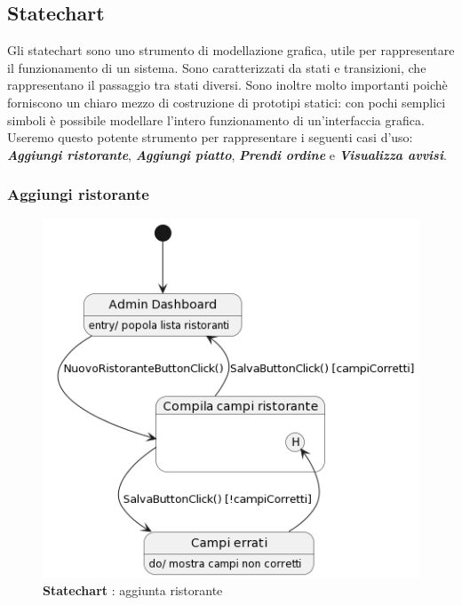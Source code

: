 \subsection{Statechart}
    \begin{flushleft}
        Gli statechart sono uno strumento
        di modellazione grafica, utile per rappresentare il funzionamento di un
        sistema. Sono caratterizzati da stati e transizioni, che rappresentano il
        passaggio tra stati diversi. Sono inoltre molto importanti poichè forniscono
        un chiaro mezzo di costruzione di prototipi statici: con pochi semplici
        simboli è possibile modellare l'intero funzionamento di un'interfaccia grafica.
        Useremo questo potente strumento per rappresentare i seguenti casi d'uso:
        \emph{\textbf{Aggiungi ristorante}}, \emph{\textbf{Aggiungi piatto}}, 
        \emph{\textbf{Prendi ordine}} e \emph{\textbf{Visualizza avvisi}}. 
    \end{flushleft}

    \subsubsection{Aggiungi ristorante}
        \begin{figure}[H]
            \centering
            \includegraphics[scale=0.65]{assets/diagrammi/Statechart/aggiungiRistorante.png}
            \caption*{\textbf{Statechart} : aggiunta ristorante}\label{fig:Statechart_AddResturant}
        \end{figure}

